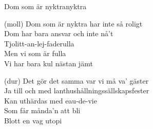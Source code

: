 \begin{song}{Dom som är nyktra}{nyktra}
\begin{vers}
(moll) Dom som är nyktra har inte så roligt\\
Dom har bara ansvar och inte nå't\\
Tjolitt-an-lej-faderulla\\
Men vi som är fulla\\
Vi har bara kul nästan jämt\\
\end{vers}
\begin{vers}
(dur) Det gör det samma var vi må va' gäster\\
Ja till och med lanthushållningssällskapsfester\\
Kan uthärdas med eau-de-vie\\
Som får månda'n att bli\\
Blott en vag utopi\\
\end{vers}
\end{song}

